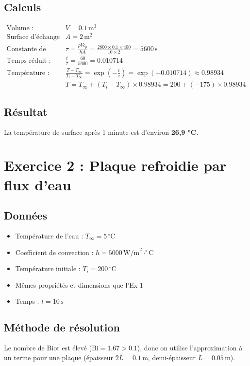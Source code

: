 \documentclass{rapportECL}
\begin{document}
\subsection*{Calculs}
\begin{align*}
\text{Volume : } & V = 0.1 \, \text{m}^3 \\
\text{Surface d'échange : } & A = 2 \, \text{m}^2 \\
\text{Constante de temps : } & \tau = \frac{\rho V c_p}{h A} = \frac{2800 \times 0.1 \times 400}{10 \times 2} = 5600 \, \text{s} \\
\text{Temps réduit : } & \frac{t}{\tau} = \frac{60}{5600} = 0.010714 \\
\text{Température : } & \frac{T - T_{\infty}}{T_i - T_{\infty}} = \exp\left(-\frac{t}{\tau}\right) = \exp(-0.010714) \approx 0.98934 \\
& T = T_{\infty} + (T_i - T_{\infty}) \times 0.98934 = 200 + (-175) \times 0.98934
\end{align*}

\subsection*{Résultat}
La température de surface après 1 minute est d'environ \textbf{26,9 °C}.

\section{Exercice 2 : Plaque refroidie par flux d'eau}

\subsection*{Données}
\begin{itemize}
    \item Température de l'eau : \( T_{\infty} = 5 \, ^\circ \text{C} \)
    \item Coefficient de convection : \( h = 5000 \, \text{W/m}^2 \cdot ^\circ \text{C} \)
    \item Température initiale : \( T_i = 200 \, ^\circ \text{C} \)
    \item Mêmes propriétés et dimensions que l'Ex 1
    \item Temps : \( t = 10 \, \text{s} \)
\end{itemize}

\subsection*{Méthode de résolution}
Le nombre de Biot est élevé (\( \text{Bi} = 1.67 > 0.1 \)), donc on utilise l'approximation à un terme pour une plaque (épaisseur \( 2L = 0.1 \, \text{m} \), demi-épaisseur \( L = 0.05 \, \text{m} \)).
\end{document}
